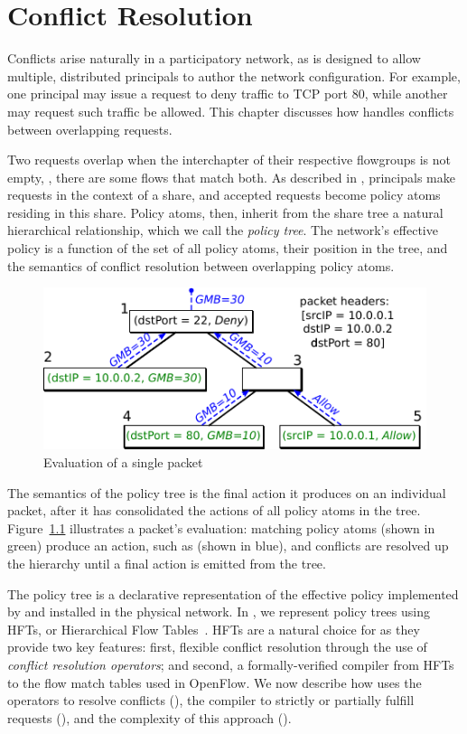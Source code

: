 \chapter{Conflict Resolution}
\label{sec:conflicts}

Conflicts arise naturally in a participatory network, as \sys is
designed to allow multiple, distributed principals to author the network configuration.
For example, one principal may issue a request to deny traffic to
TCP port 80, while another may request  such traffic be allowed.
This chapter discusses how \sys handles conflicts between overlapping requests.

Two requests overlap when the interchapter of their
respective flowgroups is not empty, \ie, there are some flows that
match both.  As described in , principals
make requests in the context of a share, and accepted requests
become policy atoms residing in this share. Policy atoms, then,
inherit from the share tree a natural hierarchical relationship,
which we call the \emph{policy tree}. The network's effective policy is a function
of the set of all policy atoms, their position in the tree, and the
semantics of conflict resolution between overlapping policy atoms.

\begin{figure}
\centering
\includegraphics{figs/evaltree}
\caption{Evaluation of a single packet}
\label{f:evaltree}
\end{figure}

The semantics of the policy tree is the final action it produces on an
individual packet, after it has consolidated the actions of all
policy atoms in the tree. Figure~\ref{f:evaltree} illustrates a packet's
evaluation: matching policy atoms (shown in green) produce an action,
such as  (shown in blue), and conflicts are resolved up the
hierarchy until a final action is emitted from the tree.

The policy tree is a declarative representation of the effective policy implemented by
\sys and installed in the physical network. In \sys, we represent
policy trees using HFTs, or Hierarchical Flow Tables~\cite{Ferguson:2012b}.
HFTs are a natural choice for \sys as they provide two key features:
first, flexible conflict resolution through the use of \emph{conflict resolution operators};
and second, a formally-verified compiler from HFTs to the flow match tables
used in OpenFlow.
We now describe how \sys uses the operators to resolve conflicts (),
the compiler to strictly or partially fulfill requests (),
and the complexity of this approach ().

